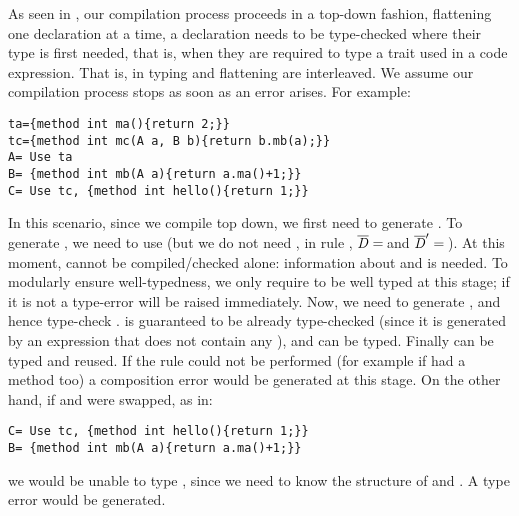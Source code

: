 As seen in , our compilation process
proceeds in a top-down fashion, flattening one declaration at a time,
a declaration needs
to be type-checked where their type is first needed,
that is, when they are required to type a trait used in a code expression.
That is, in \name typing and flattening are interleaved. We assume our compilation process stops as soon as 
an error arises. 
For example:
\begin{lstlisting}
ta={method int ma(){return 2;}}
tc={method int mc(A a, B b){return b.mb(a);}}
A= Use ta
B= {method int mb(A a){return a.ma()+1;}}
C= Use tc, {method int hello(){return 1;}}
\end{lstlisting}
In this scenario, since we compile top down, we first need to generate \Q@A@.
To generate \Q@A@, we need to use \Q@ta@ (but we do not need
\Q@tc@, in rule , $\overline{\mathit{D}}=\,$\Q@ta@ and $\overline{\mathit{D}}'=\,$\Q@tc@).
At this moment, \Q@tc@ cannot be compiled/checked alone:
information about \Q@A@ and \Q@B@ is needed.
To modularly ensure well-typedness,
we only require \Q@ta@ to be well typed at this stage; if it is not a type-error will be raised immediately. %
Now, we need to generate \Q@C@, and hence type-check \Q@tc@.
\Q@A@ is guaranteed to be already type-checked 
(since it is generated by an expression that does not contain any \mL),
and \Q@B@ can be typed. Finally \Q@tc@ can be typed and reused.
If the  rule could not be performed (for example if \Q@tc@ had a method \Q@hello@ too)
a composition error would be generated at this stage.
On the other hand, if \Q@B@ and \Q@C@ were swapped, as in:
\begin{lstlisting}
C= Use tc, {method int hello(){return 1;}}
B= {method int mb(A a){return a.ma()+1;}}
\end{lstlisting}
\noindent
we would be unable to type \Q@tc@, since we need to know the structure of \Q@A@ and \Q@B@.
A type error would be generated.%


